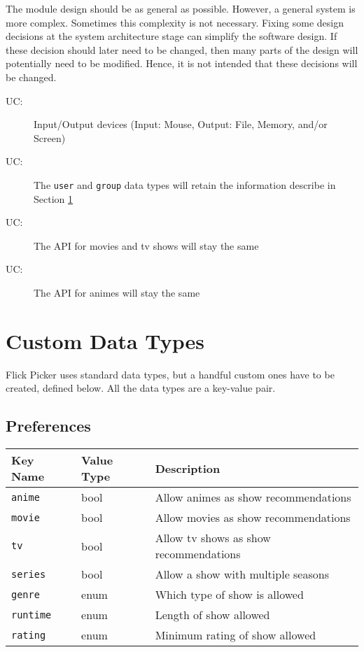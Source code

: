 \documentclass[12pt, titlepage]{article}
\newcounter{ucnum}
\newcommand{\uctheucnum}{UC\theucnum}
\begin{document}
The module design should be as general as possible. However, a general system is
more complex. Sometimes this complexity is not necessary. Fixing some design
decisions at the system architecture stage can simplify the software design. If
these decision should later need to be changed, then many parts of the design
will potentially need to be modified. Hence, it is not intended that these
decisions will be changed.

\begin{description}
\item[ \uctheucnum \label{ucIO}:] Input/Output devices (Input: Mouse, Output: File, Memory, and/or Screen)
\item[ \uctheucnum \label{ucCD}:] The \verb_user_ and \verb_group_ data types will retain the information describe in Section \ref{SecCD}
\item[ \uctheucnum \label{ucAPIMT}:] The API for movies and tv shows will stay the same
\item[ \uctheucnum \label{ucAPIA}:] The API for animes will stay the same
\end{description}

\section{Custom Data Types} \label{SecCD}
Flick Picker uses standard data types, but a handful custom ones have to be created, defined below. All the data types are a key-value pair.

\subsection{Preferences}
\begin{tabularx}{\textwidth}{|p{3.3cm}|p{3cm}|X|}
\hline
{\bf Key Name} & {\bf Value Type} & {\bf Description}\\
\hline
\verb_anime_ & bool & Allow animes as show recommendations\\
\hline
\verb_movie_ & bool & Allow movies as show recommendations\\
\hline
\verb_tv_ & bool & Allow tv shows as show recommendations\\
\hline
\verb_series_ & bool & Allow a show with multiple seasons\\
\hline
\verb_genre_ & enum & Which type of show is allowed\\
\hline
\verb_runtime_ & enum & Length of show allowed\\
\hline
\verb_rating_ & enum & Minimum rating of show allowed\\
\hline
\end{tabularx}
\end{document}
